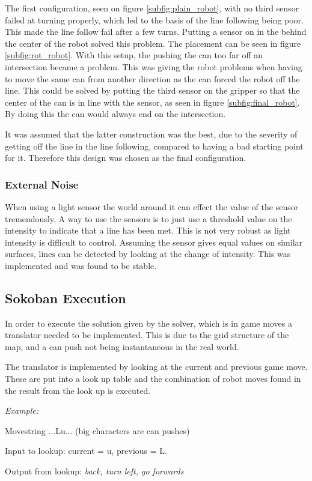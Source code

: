 The first configuration, seen on figure \ref{subfig:plain_robot}, with no third sensor failed at turning properly, which led to the basis of the line following being poor. This made the line follow fail after a few turns. Putting a sensor on in the behind the center of the robot solved this problem. The placement can be seen in figure \ref{subfig:rot_robot}. 
With this setup, the pushing the can too far off an intersection became a problem.
This was giving the robot problems when having to move the same can from another direction as the can forced the robot off the line.
This could be solved by putting the third sensor on the gripper so that the center of the can is in line with the sensor, as seen in figure \ref{subfig:final_robot}. 
By doing this the can would always end on the intersection. 

It was assumed that the latter construction was the best, due to the severity of getting off the line in the line following, compared to having a bad starting point for it. Therefore this design was chosen as the final configuration.

\subsubsection{External Noise}
When using a light sensor the world around it can effect the value of the sensor tremendously.
A way to use the sensors is to just use a threshold value on the intensity to indicate that a line has been met.
This is not very robust as light intensity is difficult to control.
Assuming the sensor gives equal values on similar surfaces, lines can be detected by looking at the change of intensity.
This was implemented and was found to be stable.

\subsection{Sokoban Execution}

In order to execute the solution given by the solver, which is in game moves a translator needed to be implemented. This is due to the grid structure of the map, and a can push not being instantaneous in the real world.

The translator is implemented by looking at the current and previous game move. These are put into a look up table and the combination of robot moves found in the result from the look up is executed. 

\vspace{10pt}
{\large \textit{Example:}} 

\noindent
Movestring ...Lu... (big characters are can pushes)

\noindent
Input to lookup: current = u, previous = L.

\noindent
Output from lookup: \textit{back, turn left, go forwards}

